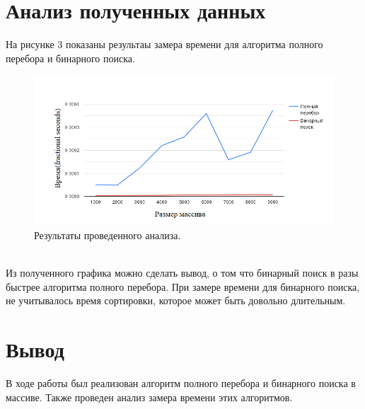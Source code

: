 \documentclass[a4paper, 12pt]{article}
\begin{document}
\section{Анализ полученных данных}
\hspace*{5mm} На рисунке 3 показаны результаы замера времени для алгоритма полного перебора и бинарного поиска.
\begin{figure}[h]
	\centering \includegraphics[scale=1.7]{chart}
	\centering\caption{Результаты проведенного анализа.}
\end{figure}
\\ \hspace*{5mm} Из полученного графика можно сделать вывод, о том что бинарный поиск в разы быстрее алгоритма полного перебора. При замере времени для бинарного поиска, не учитывалось время сортировки, которое может быть довольно длительным. 

\section*{Вывод}
\hspace*{5mm} В ходе работы был реализован алгоритм полного перебора и бинарного поиска в массиве. Также проведен анализ замера времени этих алгоритмов.
\end{document}
